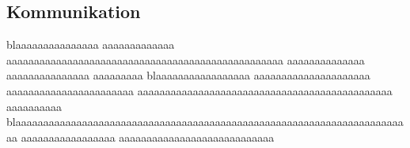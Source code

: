 \subsection{Kommunikation}

blaaaaaaaaaaaaaaa aaaaaaaaaaaaa aaaaaaaaaaaaaaaaaaaaaaaaaaaaaaaaaaaaaaaaaaaaaaaaaa aaaaaaaaaaaaaa aaaaaaaaaaaaaaa aaaaaaaaa
blaaaaaaaaaaaaaaaaa aaaaaaaaaaaaaaaaaaaaa aaaaaaaaaaaaaaaaaaaaaaa aaaaaaaaaaaaaaaaaaaaaaaaaaaaaaaaaaaaaaaaaaaaaa aaaaaaaaaa
blaaaaaaaaaaaaaaaaaaaaaaaaaaaaaaaaaaaaaaaaaaaaaaaaaaaaaaaaaaaaaaaaaaaaaaaa aaaaaaaaaaaaaaaaa aaaaaaaaaaaaaaaaaaaaaaaaaaaa
